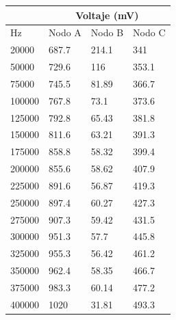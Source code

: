 \begin{table}[H]
\centering
\begin{tabular}{l|lll|}
\cline{2-4}
                             & \multicolumn{3}{c|}{Voltaje (mV)}                                  \\ \hline
\multicolumn{1}{|l|}{Hz}     & \multicolumn{1}{c|}{Nodo A} & \multicolumn{1}{l|}{Nodo B} & Nodo C \\ \hline
\multicolumn{1}{|l|}{20000} & \multicolumn{1}{l|}{687.7}  & \multicolumn{1}{l|}{214.1}  & 341    \\ \hline
\multicolumn{1}{|l|}{50000}  & \multicolumn{1}{l|}{729.6}  & \multicolumn{1}{l|}{116}    & 353.1  \\ \hline
\multicolumn{1}{|l|}{75000}  & \multicolumn{1}{l|}{745.5}  & \multicolumn{1}{l|}{81.89}  & 366.7  \\ \hline
\multicolumn{1}{|l|}{100000} & \multicolumn{1}{l|}{767.8}  & \multicolumn{1}{l|}{73.1}   & 373.6  \\ \hline
\multicolumn{1}{|l|}{125000} & \multicolumn{1}{l|}{792.8}  & \multicolumn{1}{l|}{65.43}  & 381.8  \\ \hline
\multicolumn{1}{|l|}{150000} & \multicolumn{1}{l|}{811.6}  & \multicolumn{1}{l|}{63.21}  & 391.3  \\ \hline
\multicolumn{1}{|l|}{175000} & \multicolumn{1}{l|}{858.8}  & \multicolumn{1}{l|}{58.32}  & 399.4  \\ \hline
\multicolumn{1}{|l|}{200000} & \multicolumn{1}{l|}{855.6}  & \multicolumn{1}{l|}{58.62}  & 407.9  \\ \hline
\multicolumn{1}{|l|}{225000} & \multicolumn{1}{l|}{891.6}  & \multicolumn{1}{l|}{56.87}  & 419.3  \\ \hline
\multicolumn{1}{|l|}{250000} & \multicolumn{1}{l|}{897.4}  & \multicolumn{1}{l|}{60.27}  & 427.3  \\ \hline
\multicolumn{1}{|l|}{275000} & \multicolumn{1}{l|}{907.3}  & \multicolumn{1}{l|}{59.42}  & 431.5  \\ \hline
\multicolumn{1}{|l|}{300000} & \multicolumn{1}{l|}{951.3}  & \multicolumn{1}{l|}{57.7}   & 445.8  \\ \hline
\multicolumn{1}{|l|}{325000} & \multicolumn{1}{l|}{955.3}  & \multicolumn{1}{l|}{56.42}  & 461.2  \\ \hline
\multicolumn{1}{|l|}{350000} & \multicolumn{1}{l|}{962.4}  & \multicolumn{1}{l|}{58.35}  & 466.7  \\ \hline
\multicolumn{1}{|l|}{375000} & \multicolumn{1}{l|}{983.3}  & \multicolumn{1}{l|}{60.14}  & 477.2  \\ \hline
\multicolumn{1}{|l|}{400000} & \multicolumn{1}{l|}{1020}   & \multicolumn{1}{l|}{31.81}  & 493.3  \\ \hline
\end{tabular}
\end{table}

